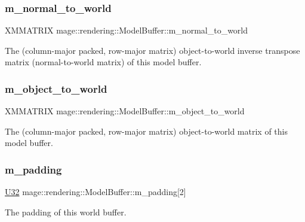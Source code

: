 \subsubsection{\texorpdfstring{m\+\_\+normal\+\_\+to\+\_\+world}{m\_normal\_to\_world}}
{\footnotesize\ttfamily X\+M\+M\+A\+T\+R\+IX mage\+::rendering\+::\+Model\+Buffer\+::m\+\_\+normal\+\_\+to\+\_\+world}

The (column-\/major packed, row-\/major matrix) object-\/to-\/world inverse transpose matrix (normal-\/to-\/world matrix) of this model buffer. \hypertarget{structmage_1_1rendering_1_1_model_buffer_a1ab813830152789c92ff9313a291c8a2}{}\label{structmage_1_1rendering_1_1_model_buffer_a1ab813830152789c92ff9313a291c8a2} 
\subsubsection{\texorpdfstring{m\+\_\+object\+\_\+to\+\_\+world}{m\_object\_to\_world}}
{\footnotesize\ttfamily X\+M\+M\+A\+T\+R\+IX mage\+::rendering\+::\+Model\+Buffer\+::m\+\_\+object\+\_\+to\+\_\+world}

The (column-\/major packed, row-\/major matrix) object-\/to-\/world matrix of this model buffer. \hypertarget{structmage_1_1rendering_1_1_model_buffer_a70baa6277c4c247a1fd8ea86d822604c}{}\label{structmage_1_1rendering_1_1_model_buffer_a70baa6277c4c247a1fd8ea86d822604c} 
\subsubsection{\texorpdfstring{m\+\_\+padding}{m\_padding}}
{\footnotesize\ttfamily \hyperlink{namespacemage_a41c104c036fba3756a74e19f793eeaa1}{U32} mage\+::rendering\+::\+Model\+Buffer\+::m\+\_\+padding\mbox{[}2\mbox{]}}

The padding of this world buffer. \hypertarget{structmage_1_1rendering_1_1_model_buffer_acf90738f4c6cab2922d12e9fc9bf36ca}{}\label{structmage_1_1rendering_1_1_model_buffer_acf90738f4c6cab2922d12e9fc9bf36ca} 
